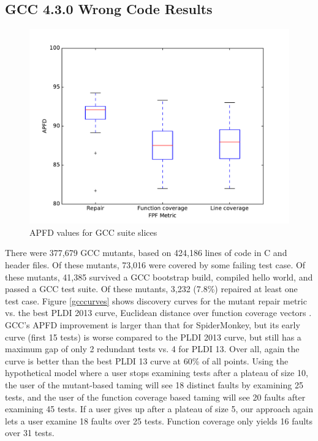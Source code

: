 \subsection{GCC 4.3.0 Wrong Code Results}


\begin{figure}
  \centering
  \includegraphics[width=0.8\columnwidth]{comparegcc}
  \caption{APFD values for GCC suite slices}
  \label{comparegcc}
\end{figure}%

There were 377,679 GCC mutants, based on 424,186 lines of code in C and header files. Of these mutants, 73,016 were covered by some failing test case.  Of these mutants, 41,385 survived a GCC bootstrap build, compiled hello world, and passed a GCC test suite.  Of these mutants, 3,232 (7.8\%) repaired at least one test case.  Figure \ref{gcccurves} shows discovery curves for the mutant repair metric vs. the best PLDI 2013 curve, Euclidean distance over function coverage vectors \cite{PLDI13}.  GCC's APFD improvement is larger than that for SpiderMonkey, but its early curve (first 15 tests) is worse compared to the PLDI 2013 curve, but still has a maximum gap of only 2 redundant tests vs. 4 for PLDI 13.  Over all, again the curve is better than the best PLDI 13 curve at 60\% of all points.  Using the hypothetical model where a user stops examining tests after a plateau of size 10, the user of the mutant-based taming will see 18 distinct faults by examining 25 tests, and the user of the function coverage based taming will see 20 faults after examining 45 tests.  If a user gives up after a plateau of size 5, our approach again lets a user examine 18 faults over 25 tests.  Function coverage only yields 16 faults over 31 tests. 


